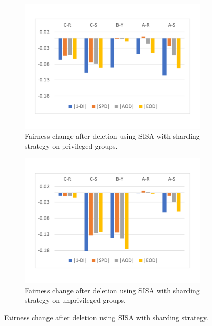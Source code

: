 \begin{figure}[t!]
  \centering
  \begin{subfigure}[b]{0.24\textwidth}
  \centering
  \includegraphics[width=\textwidth]{assets/rq3-before-after-deletion-privileged.pdf}
  \caption{Fairness change after deletion using SISA with sharding strategy on privileged groups.}
  \label{fig:rq3-before-after-deletion-privileged}
  \end{subfigure}
  \begin{subfigure}[b]{0.24\textwidth}
  \centering
  \includegraphics[width=\textwidth]{assets/rq3-before-after-deletion-unprivileged.pdf}
  \caption{Fairness change after deletion using SISA with sharding strategy on unprivileged groups.}
  \label{fig:rq3-before-after-deletion-unprivileged}
  \end{subfigure}
  \caption{Fairness change after deletion using SISA with sharding strategy.}
  \label{fig:rq3-before-after-deletion-diff}
\end{figure}




